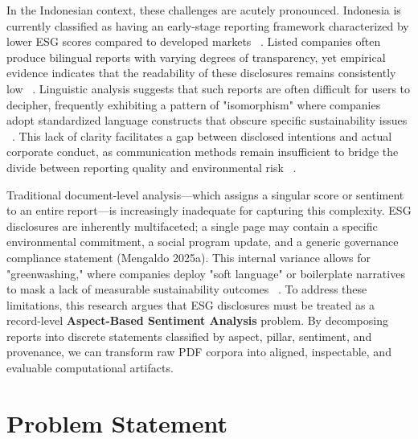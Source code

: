 \documentclass[english, online, cse, master]{dithesis}
\begin{document}
In the Indonesian context, these challenges are acutely pronounced. Indonesia is currently classified as having an early-stage reporting framework characterized by lower ESG scores compared to developed markets  ~\cite{monica_singhania_286966ff}. Listed companies often produce bilingual reports with varying degrees of transparency, yet empirical evidence indicates that the readability of these disclosures remains consistently low  ~\cite{desi_adhariani_toit_543335d6}. Linguistic analysis suggests that such reports are often difficult for users to decipher, frequently exhibiting a pattern of "isomorphism" where companies adopt standardized language constructs that obscure specific sustainability issues  ~\cite{desi_adhariani_toit_543335d6}. This lack of clarity facilitates a gap between disclosed intentions and actual corporate conduct, as communication methods remain insufficient to bridge the divide between reporting quality and environmental risk  ~\cite[]{marsdenia_010e13e7, iman_harymawan_2ef898fe}.

Traditional document-level analysis—which assigns a singular score or sentiment to an entire report—is increasingly inadequate for capturing this complexity. ESG disclosures are inherently multifaceted; a single page may contain a specific environmental commitment, a social program update, and a generic governance compliance statement (Mengaldo 2025a). This internal variance allows for "greenwashing," where companies deploy "soft language" or boilerplate narratives to mask a lack of measurable sustainability outcomes  ~\cite{habiba_al_shaer_c2f5394b}. To address these limitations, this research argues that ESG disclosures must be treated as a record-level \textbf{Aspect-Based Sentiment Analysis} problem. By decomposing reports into discrete statements classified by aspect, pillar, sentiment, and provenance, we can transform raw PDF corpora into aligned, inspectable, and evaluable computational artifacts.
\section{Problem Statement}
\end{document}
